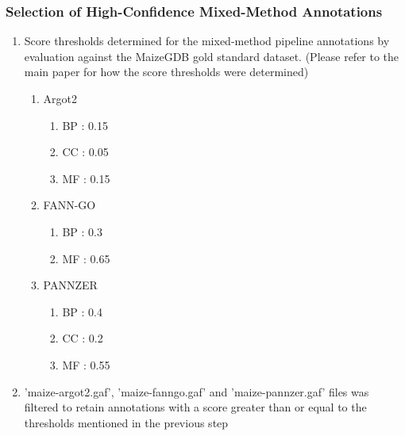     \subsubsection{Selection of High-Confidence Mixed-Method Annotations}
      \begin{enumerate}
        \item Score thresholds determined for the mixed-method pipeline annotations by evaluation against the MaizeGDB gold standard dataset. (Please refer to the main paper for how the score thresholds were determined)
        \begin{enumerate}
          \item Argot2
          \begin{enumerate}
            \item BP : 0.15
            \item CC : 0.05
            \item MF : 0.15
          \end{enumerate}
          \item FANN-GO
          \begin{enumerate}
            \item BP : 0.3
            \item MF : 0.65
          \end{enumerate}
          \item PANNZER
          \begin{enumerate}
            \item BP : 0.4
            \item CC : 0.2
            \item MF : 0.55
          \end{enumerate}
        \end{enumerate}
        \item 'maize-argot2.gaf', 'maize-fanngo.gaf' and 'maize-pannzer.gaf' files was filtered to retain annotations with a score greater than or equal to the thresholds mentioned in the previous step
      \end{enumerate}
